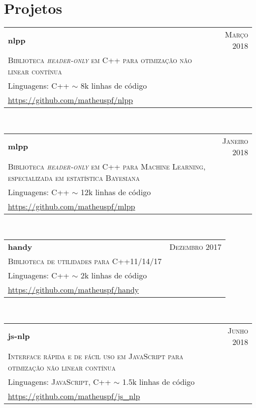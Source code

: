\section{Projetos}

\begin{tabular}{p{11cm}|r}
  \label{nlpp}
  \textbf{nlpp}  & \textsc{Março 2018} \\
  \textsc{Biblioteca \textit{header-only} em C++ para otimização não linear contínua} & \\
  \footnotesize{Linguagens: \textsc{C++}} \hspace{0.5cm} $\sim$ 8k linhas de código & \\
  \footnotesize{\url{https://github.com/matheuspf/nlpp}} & \\
\end{tabular}\\

\begin{tabular}{p{11cm}|r}
  \label{mlpp}
  \textbf{mlpp}  & \textsc{Janeiro 2018} \\
  \textsc{Biblioteca \textit{header-only} em C++ para Machine Learning, especializada em estatística Bayesiana} & \\
  \footnotesize{Linguagens: \textsc{C++}} \hspace{0.5cm} $\sim$ 12k linhas de código & \\
  \footnotesize{\url{https://github.com/matheuspf/mlpp}} & \\
\end{tabular}\\

\begin{tabular}{p{11cm}|r}
  \textbf{handy}  & \textsc{Dezembro 2017} \\
  \textsc{Biblioteca de utilidades para C++11/14/17} & \\
  \footnotesize{Linguagens: \textsc{C++}} \hspace{0.5cm} $\sim$ 2k linhas de código & \\
  \footnotesize{\url{https://github.com/matheuspf/handy}} & \\
\end{tabular}\\

\begin{tabular}{p{11cm}|r}
  \label{js-nlp}
  \textbf{js-nlp}  & \textsc{Junho 2018} \\
  \textsc{Interface rápida e de fácil uso em JavaScript para otimização não linear contínua} & \\
  \footnotesize{Linguagens: \textsc{JavaScript, C++}} \hspace{0.5cm} $\sim$ 1.5k linhas de código & \\
  \footnotesize{\url{https://github.com/matheuspf/js_nlp}} & \\
\end{tabular}\\

